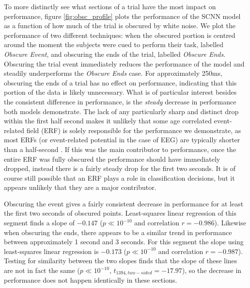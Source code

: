 \documentclass[fleqn,10pt]{wlscirep}
\begin{document}
To more distinctly see what sections of a trial have the most impact on performance, figure \ref{fig:obsc_profile} plots the performance of the SCNN model as a function of how much of the trial is obscured by white noise. We plot the performance of two different techniques: when the obscured portion is centred around the moment the subjects were cued to perform their task, labelled {\em Obscure Event}, and obscuring the ends of the trial, labelled {\em Obscure Ends}. Obscuring the trial event immediately reduces the performance of the model and steadily underperforms the {\em Obscure Ends} case. For approximately 250ms, obscuring the ends of a trial has no effect on performance, indicating that this portion of the data is likely unnecessary. What is of particular interest besides the consistent difference in performance, is the {\em steady} decrease in performance both models demonstrate. The lack of any particularly sharp and distinct drop within the first half second makes it unlikely that some age correlated event-related field (ERF) is solely responsible for the performance we demonstrate, as most ERFs (or event-related potential in the case of EEG) are typically shorter than a half-second \cite{ElectricFieldsOfTheBrain}. If this was the main contributor to performance, once the entire ERF was fully obscured the performance should have immediately dropped, instead there is a fairly steady drop for the first two seconds. It is of course still possible that an ERF plays a role in classification decisions, but it appears unlikely that they are a major contributor.

Obscuring the event gives a fairly consistent decrease in performance for at least the first two seconds of obscured points. Least-squares linear regression of this segment finds a slope of $-0.147$ ($p \ll 10^{-10}$ and correlation $r=-0.986$). Likewise when obscuring the ends, there appears to be a similar trend in performance between approximately 1 second and 3 seconds. For this segment the slope using least-squares linear regression is $-0.173$ ($p \ll 10^{-10}$ and correlation $r=-0.987$). Testing for similarity between the two slopes finds that the slope of these lines are not in fact the same ($p \ll 10^{-10}$, $t_{1394, two-sided}=-17.97$), so the decrease in performance does not happen identically in these sections.
\end{document}
